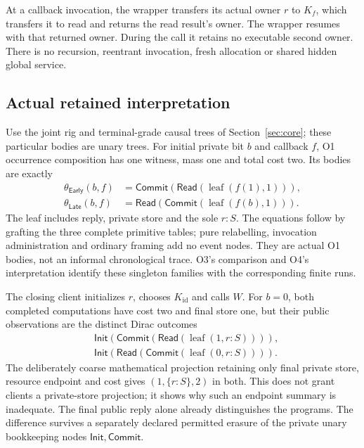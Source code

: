 \documentclass[11pt,a4paper]{article}
\theoremstyle{definition}
\newcommand{\id}{\mathrm{id}}
\newcommand{\leaf}{\operatorname{leaf}}
\begin{document}
At a callback invocation, the wrapper transfers its actual owner $r$ to
$K_f$, which transfers it to read and returns the read result's owner.
The wrapper resumes with that returned owner. During the call it retains
no executable second owner. There is no recursion, reentrant invocation,
fresh allocation or shared hidden global service.

\subsection{Actual retained interpretation}
Use the joint rig and terminal-grade causal trees of
Section~\ref{sec:core}; these particular bodies are unary trees.
For initial private bit $b$ and callback $f$, O1 occurrence composition
has one witness, mass one and total cost two. Its bodies are exactly
\begin{equation}\label{eq:I-bodies}
\begin{split}
\theta_{\mathsf{Early}}(b,f)
 &=\mathsf{Commit}(\mathsf{Read}(\leaf(f(1),1))),\\
\theta_{\mathsf{Late}}(b,f)
 &=\mathsf{Read}(\mathsf{Commit}(\leaf(f(b),1))).
\end{split}
\end{equation}
The leaf includes reply, private store and the sole $r:S$. The equations
follow by grafting the three complete primitive tables; pure relabelling,
invocation administration and ordinary framing add no event nodes.
They are actual O1 bodies, not an informal chronological trace. O3's
comparison and O4's interpretation identify these singleton families
with the corresponding finite runs.

The closing client initializes $r$, chooses $K_{\id}$ and calls $W$.
For $b=0$, both completed computations have cost two and final store one,
but their public observations are the distinct Dirac outcomes
\begin{align*}
&\mathsf{Init}(\mathsf{Commit}(\mathsf{Read}(\leaf(1,r:S)))),\\
&\mathsf{Init}(\mathsf{Read}(\mathsf{Commit}(\leaf(0,r:S)))).
\end{align*}
The deliberately coarse mathematical projection retaining only final
private store, resource endpoint and cost gives $(1,\{r:S\},2)$ in both.
This does not grant clients a private-store projection; it shows why
such an endpoint summary is inadequate. The final public reply alone
already distinguishes the programs. The difference survives a separately
declared permitted erasure of the private unary bookkeeping nodes
$\mathsf{Init},\mathsf{Commit}$.
\end{document}
